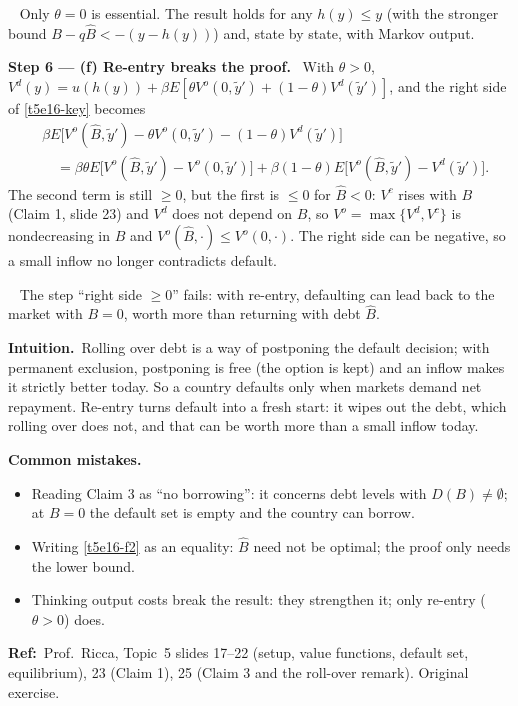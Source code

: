 \documentclass[11pt,a4paper]{article}
\newcommand{\step}[2]{\par\medskip\noindent\textbf{Step #1 --- #2.}~}
\newcommand{\intuition}{\par\medskip\noindent\textbf{Intuition.}~}
\newcommand{\refbib}{\par\smallskip\noindent\textbf{Ref:}~}
\newcommand{\answer}[1]{\par\smallskip\noindent\fbox{\textbf{Answer #1.}}~}
\newcommand{\pitfalls}{\par\medskip\noindent\textbf{Common mistakes.}}
\begin{document}
\answer{(e)} Only $\theta=0$ is essential. The result holds for any $h(y)\le y$ (with the stronger bound $B-q\hat B<-(y-h(y))$) and, state by state, with Markov output.

\step{6}{(f) Re-entry breaks the proof} With $\theta>0$, $V^d(y)=u(h(y))+\beta E[\theta V^o(0,\tilde y')+(1-\theta)V^d(\tilde y')]$, and the right side of \eqref{t5e16-key} becomes
\begin{align}
  &\beta E\big[V^o(\hat B,\tilde y')-\theta V^o(0,\tilde y')-(1-\theta)V^d(\tilde y')\big] \nonumber\\
  &\quad= \beta\theta E\big[V^o(\hat B,\tilde y')-V^o(0,\tilde y')\big] + \beta(1-\theta)E\big[V^o(\hat B,\tilde y')-V^d(\tilde y')\big]. \nonumber
\end{align}
The second term is still $\ge0$, but the first is $\le0$ for $\hat B<0$: $V^c$ rises with $B$ (Claim 1, slide 23) and $V^d$ does not depend on $B$, so $V^o=\max\{V^d,V^c\}$
is nondecreasing in $B$ and $V^o(\hat B,\cdot)\le V^o(0,\cdot)$. The right side can be negative, so a small inflow no longer contradicts default.

\answer{(f)} The step ``right side $\ge0$'' fails: with re-entry, defaulting can lead back to the market with $B=0$, worth more than returning with debt $\hat B$.

\intuition Rolling over debt is a way of postponing the default decision; with permanent exclusion, postponing is free (the option is kept) and an inflow makes it
strictly better today. So a country defaults only when markets demand net repayment. Re-entry turns default into a fresh start: it wipes out the debt, which
rolling over does not, and that can be worth more than a small inflow today.

\pitfalls
\begin{itemize}
  \item Reading Claim 3 as ``no borrowing'': it concerns debt levels with $D(B)\neq\emptyset$; at $B=0$ the default set is empty and the country can borrow.
  \item Writing \eqref{t5e16-f2} as an equality: $\hat B$ need not be optimal; the proof only needs the lower bound.
  \item Thinking output costs break the result: they strengthen it; only re-entry ($\theta>0$) does.
\end{itemize}

\refbib Prof.\ Ricca, Topic~5 slides 17--22 (setup, value functions, default set, equilibrium), 23 (Claim 1), 25 (Claim 3 and the roll-over remark). Original exercise.
\end{document}
